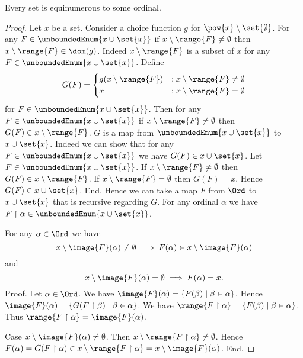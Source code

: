 \documentclass{stex}
\begin{document}
  \begin{forthel}
    \begin{theorem*}[Zermelo]
      Every set is equinumerous to some ordinal.
    \end{theorem*}
    \begin{proof}
      Let $x$ be a set.
      Consider a choice function $g$ for $\pow{x} \setminus \set{\emptyset}$.
      For any $F \in \unboundedEnum{x \cup \set{x}}$ if
      $x \setminus \range{F} \neq \emptyset$ then $x \setminus \range{F} \in
      \dom(g)$.
      Indeed $x \setminus \range{F}$ is a subset of $x$ for any $F \in
      \unboundedEnum{x \cup \set{x}}$.
      Define \[ G(F) =
        \begin{cases}
          g(x \setminus \range{F})
          & : x \setminus \range{F} \neq \emptyset
          \\
          x
          & : x \setminus \range{F} = \emptyset
        \end{cases} \]
      for $F \in \unboundedEnum{x \cup \set{x}}$.
      Then for any $F \in \unboundedEnum{x \cup \set{x}}$ if
      $x \setminus \range{F} \neq \emptyset$ then
      $G(F) \in x \setminus \range{F}$.
      $G$ is a map from $\unboundedEnum{x \cup \set{x}}$ to $x \cup \set{x}$.
      Indeed we can show that for any $F \in \unboundedEnum{x \cup \set{x}}$ we
      have $G(F) \in x \cup \set{x}$.
        Let $F \in \unboundedEnum{x \cup \set{x}}$.
        If $x \setminus \range{F} \neq \emptyset$ then
        $G(F) \in x \setminus \range{F}$.
        If $x \setminus \range{F} = \emptyset$ then $G(F) = x$.
        Hence $G(F) \in x \cup \set{x}$.
      End.
      Hence we can take a map $F$ from $\Ord$ to $x \cup \set{x}$ that is
      recursive regarding $G$.
      For any ordinal $\alpha$ we have $F \restriction \alpha \in
      \unboundedEnum{x \cup \set{x}}$.

      For any $\alpha \in \Ord$ we have
      \[ x \setminus \image{F}(\alpha) \neq \emptyset \implies
      F(\alpha) \in x \setminus \image{F}(\alpha) \]
      and
      \[ x \setminus \image{F}(\alpha) = \emptyset \implies F(\alpha) = x. \]
      Proof.
        Let $\alpha \in \Ord$.
        We have $\image{F}(\alpha) = \{ F(\beta) \mid \beta \in \alpha \}$.
        Hence $\image{F}(\alpha) = \{ G(F \restriction \beta) \mid \beta \in \alpha \}$.
        We have $\range{F \restriction \alpha} =
        \{ F(\beta) \mid \beta \in \alpha \}$.
        Thus $\range{F \restriction \alpha} = \image{F}(\alpha)$.

        Case $x \setminus \image{F}(\alpha) \neq \emptyset$.
          Then $x \setminus \range{F \restriction \alpha} \neq \emptyset$.
          Hence $F(\alpha)
            = G(F \restriction \alpha)
            \in x \setminus \range{F \restriction \alpha}
            = x \setminus \image{F}(\alpha)$.
        End.


\end{proof}
\end{forthel}
\end{document}
